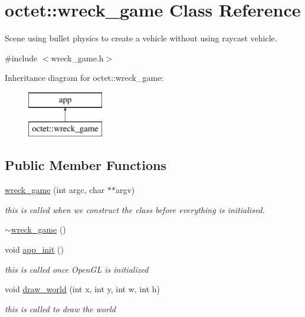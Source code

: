 \hypertarget{classoctet_1_1wreck__game}{\section{octet\+:\+:wreck\+\_\+game Class Reference}
\label{classoctet_1_1wreck__game}
}


Scene using bullet physics to create a vehicle without using raycast vehicle.  




{\ttfamily \#include $<$wreck\+\_\+game.\+h$>$}

Inheritance diagram for octet\+:\+:wreck\+\_\+game\+:\begin{figure}[H]
\begin{center}
\leavevmode
\includegraphics[height=2.000000cm]{classoctet_1_1wreck__game}
\end{center}
\end{figure}
\subsection*{Public Member Functions}
\begin{DoxyCompactItemize}
\item 
\hyperlink{classoctet_1_1wreck__game_a3415715222482226f53af7aacc322086}{wreck\+\_\+game} (int argc, char $\ast$$\ast$argv)
\begin{DoxyCompactList}\small\item\em this is called when we construct the class before everything is initialised. \end{DoxyCompactList}\item 
\hyperlink{classoctet_1_1wreck__game_aa9331cd36dbb1205931d048057061e14}{$\sim$wreck\+\_\+game} ()
\item 
void \hyperlink{classoctet_1_1wreck__game_a37f0e2212d11669e135ea848970222b5}{app\+\_\+init} ()
\begin{DoxyCompactList}\small\item\em this is called once Open\+G\+L is initialized \end{DoxyCompactList}\item 
void \hyperlink{classoctet_1_1wreck__game_a43318fc0804e69cf356cc5d35d942a66}{draw\+\_\+world} (int x, int y, int w, int h)
\begin{DoxyCompactList}\small\item\em this is called to draw the world \end{DoxyCompactList}\end{DoxyCompactItemize}


